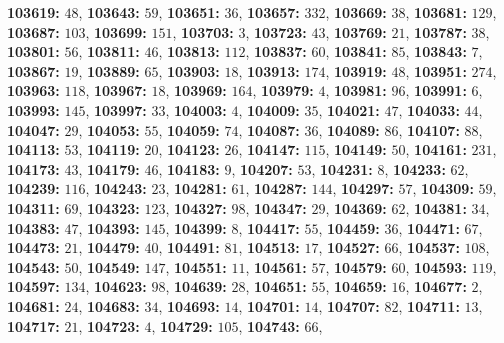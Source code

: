 \textsf{\bfseries 103619:} $48$, \textsf{\bfseries 103643:} $59$, \textsf{\bfseries 103651:} $36$, \textsf{\bfseries 103657:} $332$, \textsf{\bfseries 103669:} $38$, \textsf{\bfseries 103681:} $129$, \textsf{\bfseries 103687:} $103$, \textsf{\bfseries 103699:} $151$, \textsf{\bfseries 103703:} $3$, \textsf{\bfseries 103723:} $43$, \textsf{\bfseries 103769:} $21$, \textsf{\bfseries 103787:} $38$, \textsf{\bfseries 103801:} $56$, \textsf{\bfseries 103811:} $46$, \textsf{\bfseries 103813:} $112$, \textsf{\bfseries 103837:} $60$, \textsf{\bfseries 103841:} $85$, \textsf{\bfseries 103843:} $7$, \textsf{\bfseries 103867:} $19$, \textsf{\bfseries 103889:} $65$, \textsf{\bfseries 103903:} $18$, \textsf{\bfseries 103913:} $174$, \textsf{\bfseries 103919:} $48$, \textsf{\bfseries 103951:} $274$, \textsf{\bfseries 103963:} $118$, \textsf{\bfseries 103967:} $18$, \textsf{\bfseries 103969:} $164$, \textsf{\bfseries 103979:} $4$, \textsf{\bfseries 103981:} $96$, \textsf{\bfseries 103991:} $6$, \textsf{\bfseries 103993:} $145$, \textsf{\bfseries 103997:} $33$, \textsf{\bfseries 104003:} $4$, \textsf{\bfseries 104009:} $35$, \textsf{\bfseries 104021:} $47$, \textsf{\bfseries 104033:} $44$, \textsf{\bfseries 104047:} $29$, \textsf{\bfseries 104053:} $55$, \textsf{\bfseries 104059:} $74$, \textsf{\bfseries 104087:} $36$, \textsf{\bfseries 104089:} $86$, \textsf{\bfseries 104107:} $88$, \textsf{\bfseries 104113:} $53$, \textsf{\bfseries 104119:} $20$, \textsf{\bfseries 104123:} $26$, \textsf{\bfseries 104147:} $115$, \textsf{\bfseries 104149:} $50$, \textsf{\bfseries 104161:} $231$, \textsf{\bfseries 104173:} $43$, \textsf{\bfseries 104179:} $46$, \textsf{\bfseries 104183:} $9$, \textsf{\bfseries 104207:} $53$, \textsf{\bfseries 104231:} $8$, \textsf{\bfseries 104233:} $62$, \textsf{\bfseries 104239:} $116$, \textsf{\bfseries 104243:} $23$, \textsf{\bfseries 104281:} $61$, \textsf{\bfseries 104287:} $144$, \textsf{\bfseries 104297:} $57$, \textsf{\bfseries 104309:} $59$, \textsf{\bfseries 104311:} $69$, \textsf{\bfseries 104323:} $123$, \textsf{\bfseries 104327:} $98$, \textsf{\bfseries 104347:} $29$, \textsf{\bfseries 104369:} $62$, \textsf{\bfseries 104381:} $34$, \textsf{\bfseries 104383:} $47$, \textsf{\bfseries 104393:} $145$, \textsf{\bfseries 104399:} $8$, \textsf{\bfseries 104417:} $55$, \textsf{\bfseries 104459:} $36$, \textsf{\bfseries 104471:} $67$, \textsf{\bfseries 104473:} $21$, \textsf{\bfseries 104479:} $40$, \textsf{\bfseries 104491:} $81$, \textsf{\bfseries 104513:} $17$, \textsf{\bfseries 104527:} $66$, \textsf{\bfseries 104537:} $108$, \textsf{\bfseries 104543:} $50$, \textsf{\bfseries 104549:} $147$, \textsf{\bfseries 104551:} $11$, \textsf{\bfseries 104561:} $57$, \textsf{\bfseries 104579:} $60$, \textsf{\bfseries 104593:} $119$, \textsf{\bfseries 104597:} $134$, \textsf{\bfseries 104623:} $98$, \textsf{\bfseries 104639:} $28$, \textsf{\bfseries 104651:} $55$, \textsf{\bfseries 104659:} $16$, \textsf{\bfseries 104677:} $2$, \textsf{\bfseries 104681:} $24$, \textsf{\bfseries 104683:} $34$, \textsf{\bfseries 104693:} $14$, \textsf{\bfseries 104701:} $14$, \textsf{\bfseries 104707:} $82$, \textsf{\bfseries 104711:} $13$, \textsf{\bfseries 104717:} $21$, \textsf{\bfseries 104723:} $4$, \textsf{\bfseries 104729:} $105$, \textsf{\bfseries 104743:} $66$, 
